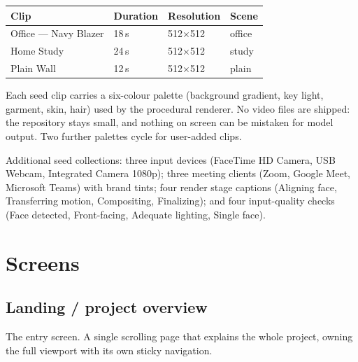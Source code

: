 \documentclass[11pt,a4paper]{report}
\begin{document}
\begin{longtable}{L{4.4cm} L{2.0cm} L{2.4cm} L{5.2cm}}
\toprule
\textbf{Clip} & \textbf{Duration} & \textbf{Resolution} & \textbf{Scene} \\
\midrule
\endhead
Office --- Navy Blazer & 18\,s & 512$\times$512 & office \\
Home Study & 24\,s & 512$\times$512 & study \\
Plain Wall & 12\,s & 512$\times$512 & plain \\
\bottomrule
\end{longtable}

Each seed clip carries a six-colour palette (background gradient, key light,
garment, skin, hair) used by the procedural renderer. No video files are
shipped: the repository stays small, and nothing on screen can be mistaken for
model output. Two further palettes cycle for user-added clips.

Additional seed collections: three input devices (FaceTime HD Camera, USB
Webcam, Integrated Camera 1080p); three meeting clients (Zoom, Google Meet,
Microsoft Teams) with brand tints; four render stage captions (Aligning
face, Transferring motion, Compositing, Finalizing); and four input-quality
checks (Face detected, Front-facing, Adequate lighting, Single face).

\chapter{Screens}

\section{Landing / project overview}

The entry screen. A single scrolling page that explains the whole project,
owning the full viewport with its own sticky navigation.
\end{document}
